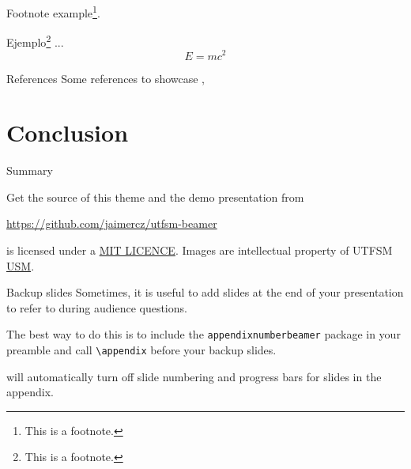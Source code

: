 %
\begin{frame}
    \frametitle{\insertsectionhead}
    \framesubtitle{\insertsubsectionhead}
	Footnote example\footnote{This is a footnote.}.
	\begin{example}
		Ejemplo\footnote{This is a footnote.} ...
		\begin{equation*}
			E =mc^2
		\end{equation*}
	\end{example}
\end{frame}


\begin{frame}{References}
  Some references to showcase 
  \citet{Knuth92},
  \citet{Simpson}
  \citet{greenwade93}
  \citet{ConcreteMath}
\end{frame}

\section{Conclusion}
\begin{frame}{Summary}

  Get the source of this theme and the demo presentation from

  \begin{center}\url{https://github.com/jaimercz/utfsm-beamer}\end{center}

  \themename is licensed under a
  \href{https://opensource.org/licenses/MIT}{MIT LICENCE}. Images are intellectual
  property of UTFSM \href{www.usm.cl}{USM}.

\end{frame}


\appendix

\begin{frame}[fragile]{Backup slides}
  Sometimes, it is useful to add slides at the end of your presentation to
  refer to during audience questions.

  The best way to do this is to include the \verb|appendixnumberbeamer|
  package in your preamble and call \verb|\appendix| before your backup slides.

  \themename will automatically turn off slide numbering and progress bars for
  slides in the appendix.
\end{frame}


